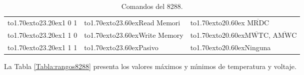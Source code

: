 \begin{table}[!hbt]
\begin{tabular}{|l|l|l|}
\cline{1-3}
\vbox to1.70ex{\vspace{1pt}\vfil\hbox to23.20ex{\hfil 1 0 1\hfil}} & 
\vbox to1.70ex{\vspace{1pt}\vfil\hbox to23.60ex{Read Memori\hfil}} & 
\vbox to1.70ex{\vspace{1pt}\vfil\hbox to20.60ex{\hfil %
$\overline{\mbox{MRDC}}$\hfil}} \\

\cline{1-3}
\vbox to1.70ex{\vspace{1pt}\vfil\hbox to23.20ex{\hfil 1 1 0\hfil}} & 
\vbox to1.70ex{\vspace{1pt}\vfil\hbox to23.60ex{Write Memory\hfil}} & 
\vbox to1.70ex{\vspace{1pt}\vfil\hbox to20.60ex{\hfil $\overline{\mbox{MWTC}}$, %
$\overline{\mbox{AMWC}}$\hfil}} \\ 

\cline{1-3}
\vbox to1.70ex{\vspace{1pt}\vfil\hbox to23.20ex{\hfil 1 1 1\hfil}} & 
\vbox to1.70ex{\vspace{1pt}\vfil\hbox to23.60ex{Pasivo\hfil}} & 
\vbox to1.70ex{\vspace{1pt}\vfil\hbox to20.60ex{\hfil Ninguna\hfil}} \\

\cline{1-3}
\end{tabular}
\caption{Comandos del 8288.}
\label{Tabla:statusword8288}
\end{table}

La Tabla \ref{Tabla:rangos8288} presenta los valores m\'aximos y m\'{\i}nimos de temperatura y %
voltaje.

